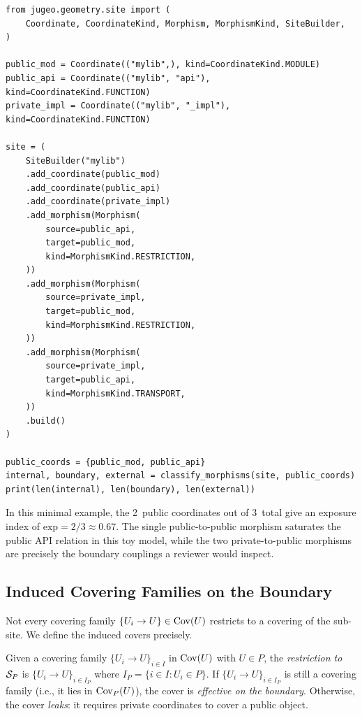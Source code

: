 \documentclass[11pt]{article}
\newcommand{\ExpIndex}{\mathrm{exp}}
\begin{document}
\begin{lstlisting}[style=jugeo-python]
from jugeo.geometry.site import (
    Coordinate, CoordinateKind, Morphism, MorphismKind, SiteBuilder,
)

public_mod = Coordinate(("mylib",), kind=CoordinateKind.MODULE)
public_api = Coordinate(("mylib", "api"), kind=CoordinateKind.FUNCTION)
private_impl = Coordinate(("mylib", "_impl"), kind=CoordinateKind.FUNCTION)

site = (
    SiteBuilder("mylib")
    .add_coordinate(public_mod)
    .add_coordinate(public_api)
    .add_coordinate(private_impl)
    .add_morphism(Morphism(
        source=public_api,
        target=public_mod,
        kind=MorphismKind.RESTRICTION,
    ))
    .add_morphism(Morphism(
        source=private_impl,
        target=public_mod,
        kind=MorphismKind.RESTRICTION,
    ))
    .add_morphism(Morphism(
        source=private_impl,
        target=public_api,
        kind=MorphismKind.TRANSPORT,
    ))
    .build()
)

public_coords = {public_mod, public_api}
internal, boundary, external = classify_morphisms(site, public_coords)
print(len(internal), len(boundary), len(external))
\end{lstlisting}

In this minimal example, the 2~public coordinates out of 3~total give an
exposure index of $\ExpIndex = 2/3 \approx 0.67$.  The single
public-to-public morphism saturates the public API relation in this toy
model, while the two private-to-public morphisms are precisely the
boundary couplings a reviewer would inspect.

\subsection{Induced Covering Families on the Boundary}\label{sec:induced-covers}

Not every covering family $\{U_i \to U\} \in \mathrm{Cov}(U)$ restricts to a
covering of the sub-site.  We define the induced covers precisely.

\begin{definition}\label{def:restricted-cover}
Given a covering family $\{U_i \to U\}_{i \in I}$ in $\mathrm{Cov}(U)$ with
$U \in P$, the \emph{restriction to} $\mathcal{S}_P$ is
$\{U_i \to U\}_{i \in I_P}$ where $I_P = \{i \in I : U_i \in P\}$.
If $\{U_i \to U\}_{i \in I_P}$ is still a covering family (i.e., it
lies in $\mathrm{Cov}_P(U)$), the cover is \emph{effective on the boundary}.
Otherwise, the cover \emph{leaks}: it requires private coordinates to
cover a public object.
\end{definition}
\end{document}
